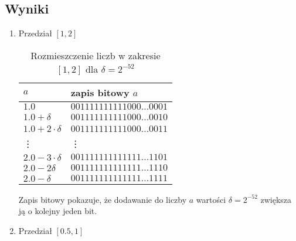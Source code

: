 \documentclass{classrep}
\begin{document}
	\subsection{Wyniki}
		\begin{enumerate}
			\item Przedział $[1,2]$
			
			\begin{table}[!h]
        		\centering
            	\begin{tabular}{ll} \toprule
                	$a$ & {zapis bitowy $a$} \\ \midrule
                	$1.0$ & $001111111111000\dots0001$ \\ 
 					$1.0+\delta$ & $001111111111000\dots0010$ \\
 					$1.0+2\cdot\delta$ & $001111111111000\dots0011$ \\
 					\vdots & \vdots \\
 					$2.0-3
 				\cdot\delta$ & $001111111111111\dots1101$ \\
 					$2.0-2\delta$ & $001111111111111\dots1110$ \\
 					$2.0-\delta$ & $001111111111111\dots1111$ \\\bottomrule
            	\end{tabular}
            	\caption{Rozmieszczenie liczb w zakresie $[1,2]$ dla $\delta = 2^{-52}$}
				\label{table:5}
   			\end{table}
   			Zapis bitowy pokazuje, że dodawanie do liczby $a$ wartości $\delta = 2^{-52}$ zwiększa ją o 
			kolejny jeden bit. 
			\newline
			
			\item Przedział $[0.5,1]$
			

\end{enumerate}
\end{document}
